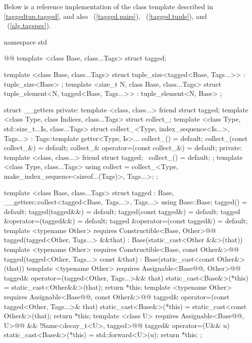 
\pnum Below is a reference implementation of the  class template described in
\ref{taggedtup.tagged}, and also ~(\ref{tagged.pairs}),
~(\ref{tagged.tuple}), and ~(\ref{alg.tagspec}).

\begin{codeblock}
namespace std { @@
  template <class Base, class...Tags>
  struct tagged;

  template <class Base, class...Tags>
  struct tuple_size<tagged<Base, Tags...>>
    : tuple_size<Base> { };
  template <size_t N, class Base, class...Tags>
  struct tuple_element<N, tagged<Base, Tags...>>
    : tuple_element<N, Base> { };

  struct __getters {
  private:
    template <class, class...> friend struct tagged;
    template <class Type, class Indices, class...Tags>
    struct collect_;
    template <class Type, std::size_t...Is, class...Tags>
    struct collect_<Type, index_sequence<Is...>, Tags...>
      : Tags::template getter<Type, Is>... {
      collect_() = default;
      collect_(const collect_&) = default;
      collect_& operator=(const collect_&) = default;
    private:
      template <class, class...> friend struct tagged;
      ~collect_() = default;
    };
    template <class Type, class...Tags>
    using collect = collect_<Type, make_index_sequence<sizeof...(Tags)>, Tags...>;
  };

  template <class Base, class...Tags>
  struct tagged
    : Base, __getters::collect<tagged<Base, Tags...>, Tags...> {
    using Base::Base;
    tagged() = default;
    tagged(tagged&&) = default;
    tagged(const tagged&) = default;
    tagged &operator=(tagged&&) = default;
    tagged &operator=(const tagged&) = default;
    template <typename Other>
      requires Constructible<Base, Other>@\newtxt{()}@
    tagged(tagged<Other, Tags...> &&that)
      : Base(static_cast<Other &&>(that)) { }
    template <typename Other>
      requires Constructible<Base, const Other&>@\newtxt{()}@
    tagged(tagged<Other, Tags...> const &that)
      : Base(static_cast<const Other&>(that)) { }
    template <typename Other>
      requires Assignable<Base@\newtxt{\&}@, Other>@\newtxt{()}@
    tagged& operator=(tagged<Other, Tags...>&& that) {
      static_cast<Base&>(*this) = static_cast<Other&&>(that);
      return *this;
    }
    template <typename Other>
      requires Assignable<Base@\newtxt{\&}@, const Other&>@\newtxt{()}@
    tagged& operator=(const tagged<Other, Tags...>& that) {
      static_cast<Base&>(*this) = static_cast<const Other&>(that);
      return *this;
    }
    template <class U>
      requires Assignable<Base@\newtxt{\&}@, U>@\newtxt{()}@ && !Same<decay_t<U>, tagged>@\newtxt{()}@
    tagged& operator=(U&& u) {
      static_cast<Base&>(*this) = std::forward<U>(u);
      return *this;
    }
  };

}
\end{codeblock}
